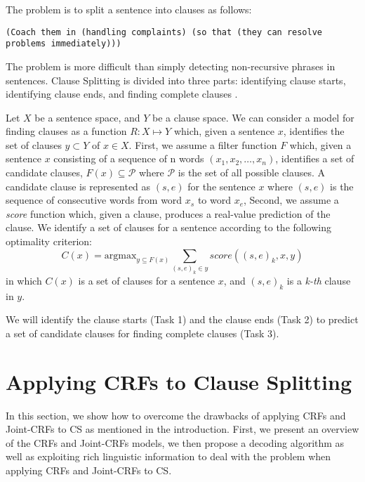 \documentclass[english]{jnlp_1.4}
\begin{document}
\noindent The problem is to split a sentence into clauses as
follows:

\texttt{(Coach them in (handling complaints) (so that (they can
   resolve problems 
\linebreak
immediately)))}

The problem is more difficult than simply detecting non-recursive
phrases in sentences. Clause Splitting is divided into three parts:
identifying clause starts, identifying clause ends, and finding
complete clauses \cite{Sang2001}.


Let $X$ be a sentence space, and $Y$ be a clause space. We can
consider a model for finding clauses as a function $R: X \mapsto Y$
which, given a sentence $x$, identifies the set of clauses $y
\subset Y$ of $x \in X$. First, we assume a filter function $F$
which, given a sentence $x$ consisting of a sequence of n words
$(x_1, x_2, \dots, x_n)$, identifies a set of candidate clauses,
${F(x)} \subseteq \mathcal{P}$ where $\mathcal{P}$ is the set of
all possible clauses. A candidate clause is represented as $(s,e)$
for the sentence $x$ where $(s,e)$ is the sequence of consecutive
words from word $x_s$ to word $x_e$,  Second, we assume a
\emph{score} function which, given a clause, produces a real-value
prediction of the clause. We identify a set of clauses for a
sentence according to the following optimality criterion:
\begin{equation}
C(x) = \mathrm{argmax}_{y \subseteq F(x)}\sum_{(s,e)_k \in
y}score((s,e)_k, x, y)
\end{equation}
in which $C(x)$ is a set of clauses for a sentence $x$,
and $(s,e)_k$ is a \emph{k-th} clause in $y$.

We will identify the clause starts (Task 1) and the clause ends
(Task 2) to predict a set of candidate clauses for finding complete
clauses (Task 3).


\section{Applying CRFs to Clause Splitting}

In this section, we show how to overcome the drawbacks of applying
CRFs and Joint-CRFs to CS as mentioned in the introduction. First,
we present an overview of the CRFs and Joint-CRFs models, we then
propose a decoding algorithm as well as exploiting rich linguistic
information to deal with the problem when applying CRFs and
Joint-CRFs to CS.
\end{document}
